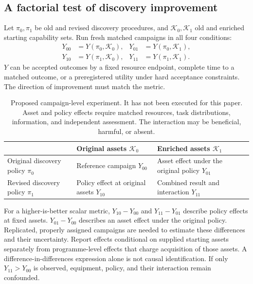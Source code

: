 \documentclass[11pt,letterpaper]{article}
\theoremstyle{remark}\newtheorem{remark}{Remark}[section]
\newcommand{\K}{\mathcal K}
\begin{document}
\subsection{A factorial test of discovery improvement}
Let $\pi_0,\pi_1$ be old and revised discovery procedures, and $\K_0,\K_1$ old and enriched starting capability sets.
Run fresh matched campaigns in all four conditions:
\begin{equation}
 \begin{aligned}
 Y_{00}&=Y(\pi_0,\K_0), &Y_{01}&=Y(\pi_0,\K_1),\\
 Y_{10}&=Y(\pi_1,\K_0), &Y_{11}&=Y(\pi_1,\K_1).
 \end{aligned}
\end{equation}
$Y$ can be accepted outcomes by a fixed resource endpoint, complete time to a matched outcome, or a preregistered utility under hard acceptance constraints.
The direction of improvement must match the metric.

\begin{table}[h]
\centering\small
\begin{tabularx}{\linewidth}{P{3.5cm}YY}
\toprule
 & Original assets $\K_0$ & Enriched assets $\K_1$\\
\midrule
Original discovery policy $\pi_0$ & Reference campaign $Y_{00}$ & Asset effect under the original policy $Y_{01}$\\
Revised discovery policy $\pi_1$ & Policy effect at original assets $Y_{10}$ & Combined result and interaction $Y_{11}$\\
\bottomrule
\end{tabularx}
\caption{Proposed campaign-level experiment. It has not been executed for this paper.
Asset and policy effects require matched resources, task distributions, information, and independent assessment.
The interaction may be beneficial, harmful, or absent.}
\label{tab:factorial}
\end{table}

For a higher-is-better scalar metric, $Y_{10}-Y_{00}$ and $Y_{11}-Y_{01}$ describe policy effects at fixed assets.
$Y_{01}-Y_{00}$ describes an asset effect under the original policy.
Replicated, properly assigned campaigns are needed to estimate these differences and their uncertainty.
Report effects conditional on supplied starting assets separately from programme-level effects that charge acquisition of those assets.
A difference-in-differences expression alone is not causal identification.
If only $Y_{11}>Y_{00}$ is observed, equipment, policy, and their interaction remain confounded.
\end{document}
